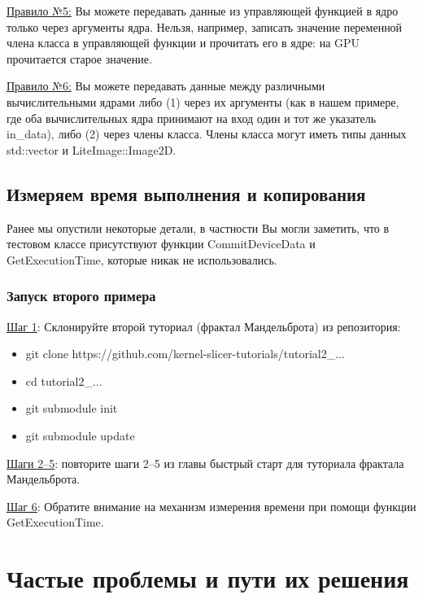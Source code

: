 \documentclass[11pt,fleqn,english,russian]{report} %
\begin{document}
\underline{Правило №5:} Вы можете передавать данные из управляющей функцией в ядро только через аргументы ядра. Нельзя, например, записать значение переменной члена класса в управляющей функции и прочитать его в ядре: на GPU прочитается старое значение.

\underline{Правило №6:} Вы можете передавать данные между различными вычислительными ядрами либо (1) через их аргументы (как в нашем примере, где оба вычислительных ядра принимают на вход один и тот же указатель in\_data), либо (2) через члены класса. Члены класса могут иметь типы данных std::vector и LiteImage::Image2D.


\section{Измеряем время выполнения и копирования}

Ранее мы опустили некоторые детали, в частности Вы могли заметить, что в тестовом классе присутствуют функции CommitDeviceData и GetExecutionTime, которые никак не использовались. 

\subsection{Запуск второго примера}

\noindent\underline{Шаг 1}: Склонируйте второй туториал (фрактал Мандельброта) из репозитория:

\begin{itemize}
	\item git clone https://github.com/kernel-slicer-tutorials/tutorial2\_...
	\item cd tutorial2\_...
	\item git submodule init
	\item git submodule update
\end{itemize}

\vspace*{5px}
\noindent\underline{Шаги 2--5}: повторите шаги 2--5 из главы быстрый старт для туториала фрактала Мандельброта. 

\vspace*{5px}
\noindent\underline{Шаг 6}: Обратите внимание на механизм измерения времени при помощи функции GetExecutionTime.


\chapter{Частые проблемы и пути их решения}
\end{document}
